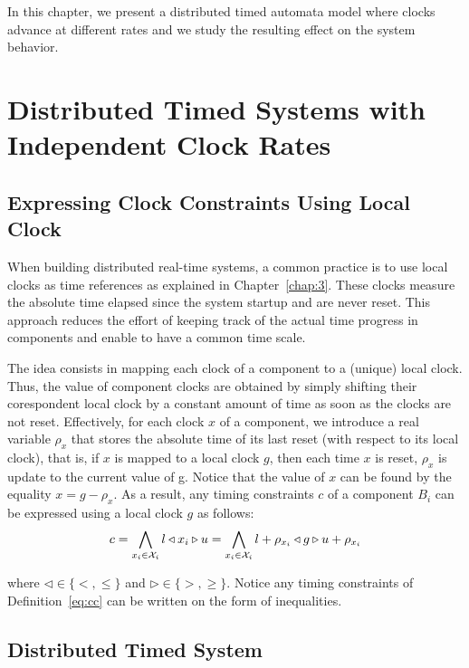In this chapter, we present a distributed timed automata model where clocks advance at 
different rates and we study the resulting effect on the system behavior.

\section{Distributed Timed Systems with Independent Clock Rates}

\subsection{Expressing Clock Constraints Using Local Clock}

When building distributed real-time systems, a common practice is to use 
local clocks as time references as explained in Chapter~\ref{chap:3}.
These clocks measure the absolute time elapsed since the system startup and are never reset. 
This approach reduces the effort of keeping track of the actual time progress in components
and enable to have a common time scale. 

The idea consists in mapping each clock of a component to a (unique) local clock.
Thus, the value of component clocks are obtained by simply shifting their corespondent local 
clock by a constant amount of time as soon as the clocks are not reset.
Effectively, for each clock $x$ of a component, we introduce a real variable $\rho_x$ that 
stores the absolute time of its last reset (with respect to its local clock), that is, if $x$ 
is mapped to a local clock $g$, then each time $x$ is reset, $\rho_x$ is update to the current 
value of g.
Notice that the value of $x$ can be found by the equality $x=g-\rho_x$.
As a result, any timing constraints $c$ of a component $B_i$ can be expressed using a 
local clock $g$ as follows:
\begin{equation}
  \label{eq:glob}
  c = \bigwedge_{x_i\in\mathcal{X}_i} l\triangleleft x_i\triangleright u
    =\bigwedge_{x_i\in\mathcal{X}_i} l+\rho_{x_i}\triangleleft g\triangleright u+\rho_{x_i}
\end{equation}

where $\triangleleft\in\{<,\le\}$ and $\triangleright\in\{>,\ge\}$.
Notice any timing constraints of Definition~\ref{eq:cc} can be written on the form of 
inequalities. 


\subsection{Distributed Timed System}

